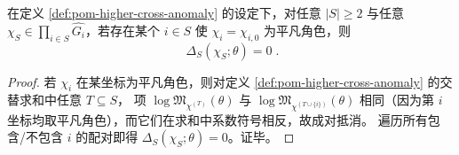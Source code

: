 \begin{proposition}\label{prop:pom-cross-anom-support-constraint}
在定义 \ref{def:pom-higher-cross-anomaly} 的设定下，对任意 \(|S|\ge 2\) 与任意 \(\chi_S\in\prod_{i\in S}\widehat{G_i}\)，若存在某个 \(i\in S\) 使 \(\chi_i=\chi_{i,0}\) 为平凡角色，则
\[
\boxed{\;
\Delta_S(\chi_S;\theta)=0\; }.
\]
\end{proposition}
\begin{proof}
若 \(\chi_i\) 在某坐标为平凡角色，则对定义 \ref{def:pom-higher-cross-anomaly} 的交替求和中任意 \(T\subseteq S\)，
项 \(\log\mathfrak{M}_{\chi^{(T)}}(\theta)\) 与 \(\log\mathfrak{M}_{\chi^{(T\cup\{i\})}}(\theta)\) 相同（因为第 \(i\) 坐标均取平凡角色），而它们在求和中系数符号相反，故成对抵消。
遍历所有包含/不包含 \(i\) 的配对即得 \(\Delta_S(\chi_S;\theta)=0\)。证毕。
\end{proof}

